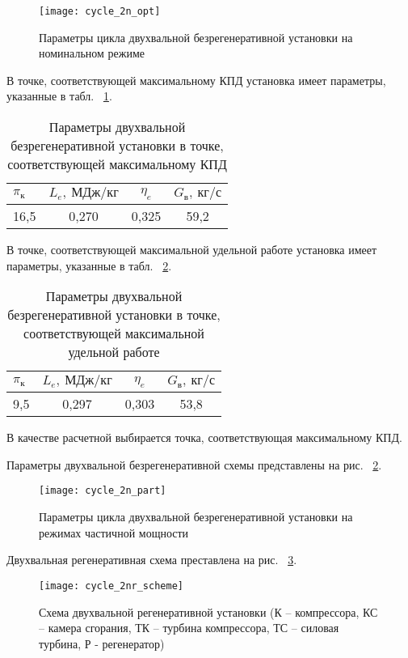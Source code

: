 \begin{figure}[H]
	\centering
	\texttt{[image: cycle\_2n\_opt]}
	\caption{Параметры цикла двухвальной безрегенеративной установки на номинальном режиме}
	\label{img:cycle_2n_opt}
\end{figure}

В точке, соответствующей максимальному КПД установка имеет параметры, указанные в табл. ~\ref{tab:cycle_2n_max_eta}.

\begin{longtable}{|p{7cm}|c|c|c|}
	\caption{Параметры двухвальной безрегенеративной установки в точке, соответствующей максимальному КПД}
	\label{tab:cycle_2n_max_eta}
	\hline
	\textbf{$\pi_к$} & \textbf{$L_e, \ МДж/кг$} & \textbf{$\eta_e$} & \textbf{$G_в, \ кг/с$} \\ \hline
	16,5 & 0,270 & 0,325 & 59,2 \\ \hline
\end{longtable}


В точке, соответствующей максимальной удельной работе установка имеет параметры, указанные в табл. ~\ref{tab:cycle_2n_max_labour}.
\begin{longtable}{|p{7cm}|c|c|c|}
	\caption{Параметры двухвальной безрегенеративной установки в точке, соответствующей максимальной удельной работе}
	\label{tab:cycle_2n_max_labour}
	\hline
	\textbf{$\pi_к$} & \textbf{$L_e, \ МДж/кг$} & \textbf{$\eta_e$} & \textbf{$G_в, \ кг/с$} \\ \hline
	9,5 & 0,297 & 0,303 & 53,8 \\ \hline
\end{longtable}

В качестве расчетной выбирается точка, соответствующая максимальному КПД.

Параметры двухвальной безрегенеративной схемы представлены на рис. ~\ref{img:cycle_2n_part}.

\begin{figure}[H]
	\centering
	\texttt{[image: cycle\_2n\_part]}
	\caption{Параметры цикла двухвальной безрегенеративной установки на режимах частичной мощности}
	\label{img:cycle_2n_part}
\end{figure}

Двухвальная регенеративная схема преставлена на рис. ~\ref{img:cycle_2nr_scheme}.

\begin{figure}[H]
	\centering
	\texttt{[image: cycle\_2nr\_scheme]}
	\caption{Схема двухвальной регенеративной установки (К – компрессора, КС – камера сгорания, ТК – турбина компрессора, ТС – силовая турбина, Р - регенератор)}
	\label{img:cycle_2nr_scheme}
\end{figure}

